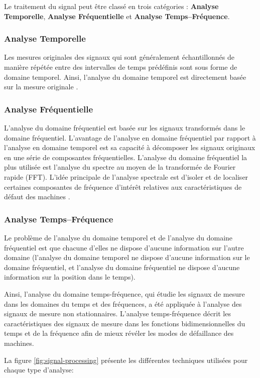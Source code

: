 Le traitement du signal peut être classé en trois catégories : \textbf{Analyse Temporelle}, \textbf{Analyse Fréquentielle} et \textbf{Analyse Temps–Fréquence}.

\subsubsection{Analyse Temporelle}
Les mesures originales des signaux qui sont généralement échantillonnés de manière répétée entre des intervalles de temps prédéfinis sont sous forme de domaine temporel. Ainsi, l'analyse du domaine temporel est directement basée sur la mesure originale \cite{Lei2016}.

\subsubsection{Analyse Fréquentielle}
L'analyse du domaine fréquentiel est basée sur les signaux transformés dans le domaine fréquentiel. L'avantage de l'analyse en domaine fréquentiel par rapport à l'analyse en domaine temporel est sa capacité à décomposer les signaux originaux en une série de composantes fréquentielles. L'analyse du domaine fréquentiel la plus utilisée est l'analyse du spectre au moyen de la transformée de Fourier rapide (FFT). L'idée principale de l'analyse spectrale est d'isoler et de localiser certaines composantes de fréquence d'intérêt relatives aux caractéristiques de défaut des machines \cite{Lei2016a}.

\subsubsection{Analyse Temps–Fréquence}
Le problème de l'analyse du domaine temporel et de l'analyse du domaine fréquentiel est que chacune d'elles ne dispose d'aucune information sur l'autre domaine (l'analyse du domaine temporel ne dispose d'aucune information sur le domaine fréquentiel, et l'analyse du domaine fréquentiel ne dispose d'aucune information sur la position dans le temps).

Ainsi, l'analyse du domaine temps-fréquence, qui
étudie les signaux de mesure dans les domaines du temps et des fréquences, a été appliquée à l'analyse des signaux de mesure non stationnaires. L'analyse temps-fréquence décrit les caractéristiques des signaux de mesure dans les fonctions bidimensionnelles du temps et de la fréquence afin de mieux révéler les modes de défaillance des machines.


La figure \ref{fig:signal-processing} présente les différentes techniques utilisées pour chaque type d'analyse:

